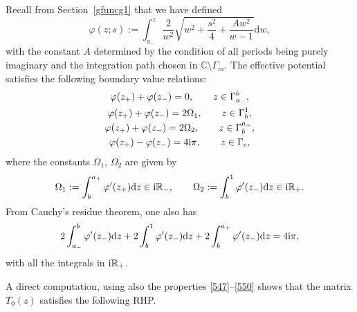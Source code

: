 \documentclass[10pt,a4paper]{amsart}
\numberwithin{equation}{section}
\theoremstyle{definition}
\def \d{{\mathrm d}}
\def\be{\begin{equation}}
\def\ee{\end{equation}}
\def\C{{\mathbb C}}
\def\R{{\mathbb R}}
\def\la{\label}
\begin{document}
Recall from Section~\ref{gfuncg1} that we have defined
\[
\varphi(z;s) := \int_{a_-}^z \frac 2 {w^2} \sqrt{w^2 + \frac {s^2}4 + \frac {Aw^2}{w-1}}\d w,
\]
with the constant $A$ determined by the condition of all periods being purely imaginary and the integration path chosen in $\C \setminus \Gamma_m$.
The effective potential satisfies the following boundary value relations:
\begin{gather}
\varphi(z_+)+ \varphi(z_-) = 0, \qquad z\in \Gamma_{a_-}^b,
\la{547}\\
\varphi(z_+)+ \varphi(z_-) = 2\Omega_1, \qquad z\in \Gamma_{b}^1,\\
\varphi(z_+)+ \varphi(z_-)= 2\Omega_2, \qquad z\in \Gamma_{b}^{a_+}, \\
\varphi(z_+)- \varphi(z_-) = 4{\rm i}\pi, \qquad z\in \Gamma_{c}\la{550},
\end{gather}
where the constants $\Omega_1$, $\Omega_2$ are given by
\be
\label{defOmega12}
\Omega_1:= \int_{b}^{a_+} \varphi'(z_+) \d z \in {\rm i}\R_-, \qquad
\Omega_2:= \int_{b}^{1} \varphi'(z_-) \d z \in {\rm i}\R_+.
\ee
From Cauchy's residue theorem, one also has
\[
2\int_{a_-}^{b} \varphi'(z_-)\d z +2\int_{b}^{1} \varphi'(z_-)\d z +2\int_{b}^{a_+} \varphi'(z_-)\d z =4{\rm i}\pi,
\]
with all the integrals in ${\rm i}\R_+$.

A direct computation, using also the properties \eqref{547}--\eqref{550} shows that the matrix $T_0(z)$ satisfies the following RHP.
\end{document}
